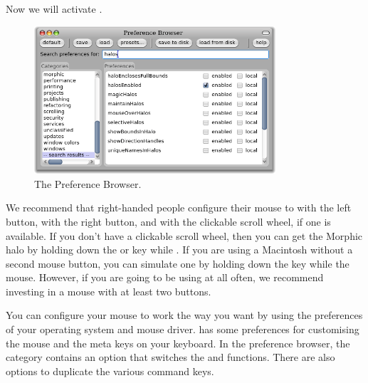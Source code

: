 \documentclass[a4paper,10pt,twoside]{book}
\begin{document}


Now we will activate .


\begin{figure}[htb]
\centerline{\includegraphics[width=0.8\textwidth]{PreferenceBrowser}}
\caption{The Preference Browser.\label{fig:prefBrowser}}
\end{figure}


We recommend that right-handed people configure their mouse to \click with the left button, \actclick with the right button, and \metaclick with the  clickable scroll wheel, if one is available.  If you don't have a clickable scroll wheel, then you can get the Morphic halo by holding down the  or  key while .  If you are using a Macintosh without a second mouse button, you can simulate one by holding down the \clover{} key while  the mouse.  However, if you are going to be using \pharo at all often, we recommend investing in a mouse with at least two buttons.

You can configure your mouse to work the way you want by using the preferences of your operating system and mouse driver.
\pharo has some preferences for customising the mouse and the meta keys on your keyboard.
In the preference browser, the  category contains an option  that switches the \actclick and \metaclick functions.
There are also options to duplicate the various command keys.   
\end{document}
